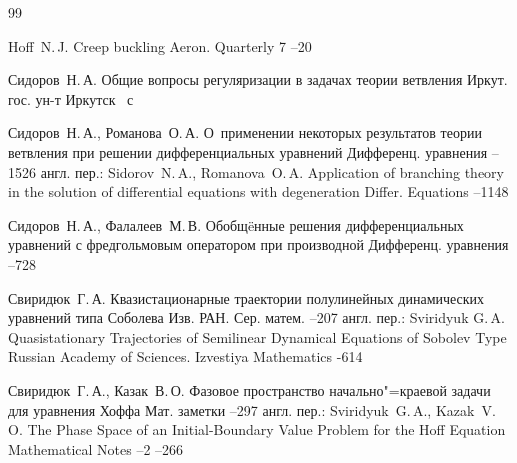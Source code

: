 \begin{thebibliography}{99}

\by Hoff~N.\,J.
\paper Creep buckling
\jour Aeron. Quarterly 7
--20

\by Сидоров~Н.\,А.
\book Общие вопросы регуляризации в задачах теории ветвления
\publ Иркут. гос. ун-т
\publaddr Иркутск
~с

\by Сидоров~Н.\,А., Романова~О.\,А.
\paper О~применении некоторых результатов теории ветвления при решении дифференциальных уравнений
\jour Дифференц. уравнения
--1526
\transl
англ. пер.:
\by Sidorov~N.\,A., Romanova~O.\,A.
\paper Application of branching theory in the solution of differential equations with degeneration
\jour Differ. Equations
--1148

\newpage 

\by Сидоров~Н.\,А., Фалалеев~М.\,В.
\paper Обобщ\"eнные решения дифференциальных уравнений с фредгольмовым оператором при производной
\jour Дифференц. уравнения
--728

\by Свиридюк~Г.\,А.
\paper Квазистационарные траектории полулинейных динамических  уравнений типа Соболева
\jour Изв. РАН. Сер. матем.
--207
\transl
англ. пер.:
\by Sviridyuk G.\,A.
\paper Quasistationary Trajectories of Semilinear Dynamical Equations of Sobolev Type
\jour Russian Academy of Sciences. Izvestiya Mathematics
-614

\by Свиридюк~Г.\,А., Казак~В.\,О.
\paper Фазовое пространство начально"=краевой задачи для уравнения Хоффа
\jour Мат. заметки
--297
\transl 
англ. пер.: 
\by Sviri\-dyuk~G.\,A., Kazak~V.\,O.
\paper The Phase Space of an Initial-Boundary Value Problem for the Hoff Equation
\jour Mathematical Notes
--2
--266


\end{thebibliography}
